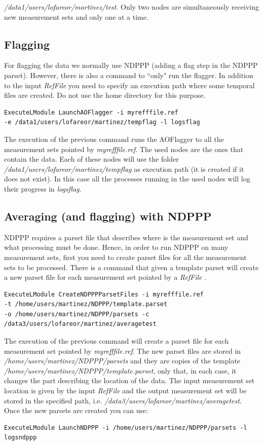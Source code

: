 \documentclass[a4paper,11pt]{article}
\begin{document}
\textit{/data1/users/lofareor/martinez/test}. Only two nodes are simultaneously receiving new measurement sets and only one at a time.

\subsection{Flagging}

For flagging the data we normally use NDPPP (adding a flag step in the NDPPP parset). However, there is also a command to ``only" run the flagger. In addition to the input \textit{RefFile} you need to specify an execution path where some temporal files are created. Do not use the home directory for this purpose. 

\begin{verbatim}
ExecuteLModule LaunchAOFlagger -i myrefffile.ref 
-e /data1/users/lofareor/martinez/tempflag -l logsflag
\end{verbatim}

The execution of the previous command runs the AOFlagger to all the measurement sets pointed by \textit{myrefffile.ref}. The used nodes are the ones that contain the data. Each of these nodes will use the folder \textit{/data1/users/lofareor/martinez/tempflag} as execution path (it is created if it does not exist). In this case all the processes running in the used nodes will log their progress in \textit{logsflag}.

\subsection{Averaging (and flagging) with NDPPP}

NDPPP requires a parset file that describes where is the measurement set and what processing must be done. Hence, in order to run NDPPP on many measurement sets, first you need to create parset files for all the measurement sets to be processed. There is a command that given a template parset will create a new parset file for each measurement set pointed by a \textit{RefFile} .

\begin{verbatim}
ExecuteLModule CreateNDPPPParsetFiles -i myrefffile.ref 
-t /home/users/martinez/NDPPP/template.parset 
-o /home/users/martinez/NDPPP/parsets -c /data3/users/lofareor/martinez/averagetest
\end{verbatim}

The execution of the previous command will create a parset file for each measurement set pointed by \textit{myrefffile.ref}. The new parset files are stored in \textit{/home/users/martinez/NDPPP/parsets} and they are copies of the template \textit{/home/users/martinez/NDPPP/template.parset}, only that, in each case, it changes the part describing the location of the data. The input measurement set location is given by the input \textit{RefFile} and the output measurement set will be stored in the specified path, i.e. \textit{/data3/users/lofareor/martinez/averagetest}. Once the new parsets are created you can use:
\begin{verbatim}
ExecuteLModule LaunchNDPPP -i /home/users/martinez/NDPPP/parsets -l logsndppp
\end{verbatim}
\end{document}
